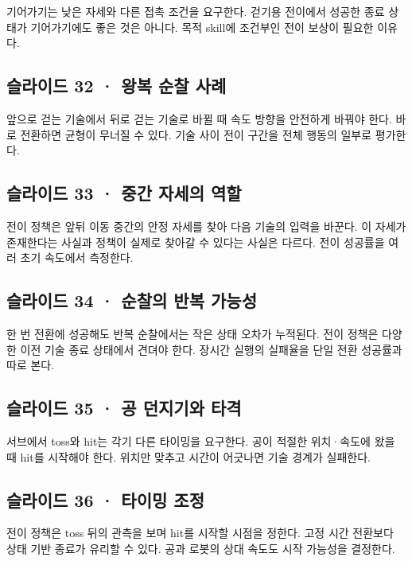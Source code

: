 \documentclass[11pt,a4paper]{article}
\begin{document}
기어가기는 낮은 자세와 다른 접촉 조건을 요구한다. 걷기용 전이에서 성공한 종료 상태가 기어가기에도 좋은 것은 아니다. 목적 skill에 조건부인 전이 보상이 필요한 이유다.\par

\subsection{슬라이드 32 · 왕복 순찰 사례}

앞으로 걷는 기술에서 뒤로 걷는 기술로 바뀔 때 속도 방향을 안전하게 바꿔야 한다. 바로 전환하면 균형이 무너질 수 있다. 기술 사이 전이 구간을 전체 행동의 일부로 평가한다.\par

\subsection{슬라이드 33 · 중간 자세의 역할}

전이 정책은 앞뒤 이동 중간의 안정 자세를 찾아 다음 기술의 입력을 바꾼다. 이 자세가 존재한다는 사실과 정책이 실제로 찾아갈 수 있다는 사실은 다르다. 전이 성공률을 여러 초기 속도에서 측정한다.\par

\subsection{슬라이드 34 · 순찰의 반복 가능성}

한 번 전환에 성공해도 반복 순찰에서는 작은 상태 오차가 누적된다. 전이 정책은 다양한 이전 기술 종료 상태에서 견뎌야 한다. 장시간 실행의 실패율을 단일 전환 성공률과 따로 본다.\par

\subsection{슬라이드 35 · 공 던지기와 타격}

서브에서 toss와 hit는 각기 다른 타이밍을 요구한다. 공이 적절한 위치·속도에 왔을 때 hit를 시작해야 한다. 위치만 맞추고 시간이 어긋나면 기술 경계가 실패한다.\par

\subsection{슬라이드 36 · 타이밍 조정}

전이 정책은 toss 뒤의 관측을 보며 hit를 시작할 시점을 정한다. 고정 시간 전환보다 상태 기반 종료가 유리할 수 있다. 공과 로봇의 상대 속도도 시작 가능성을 결정한다.\par
\end{document}
